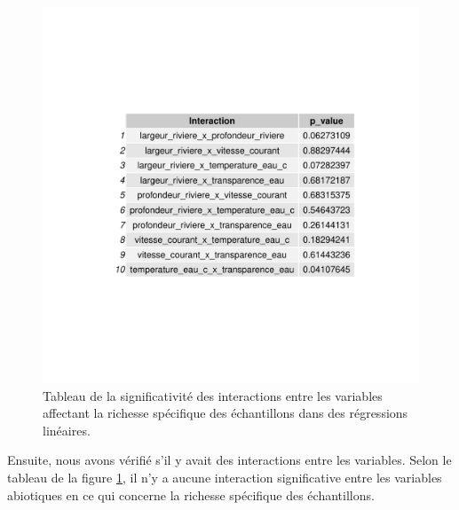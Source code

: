\documentclass[9pt,twocolumn,twoside,]{pnas-new}
\begin{document}
\begin{figure}
\centering
\includegraphics{tableau_interaction.pdf}
\caption{Tableau de la significativité des interactions entre les
variables affectant la richesse spécifique des échantillons dans des
régressions linéaires. \label{fig:tableau_interaction}}
\end{figure}

Ensuite, nous avons vérifié s'il y avait des interactions entre les
variables. Selon le tableau de la figure \ref{fig:tableau_interaction},
il n'y a aucune interaction significative entre les variables abiotiques
en ce qui concerne la richesse spécifique des échantillons.
\end{document}
